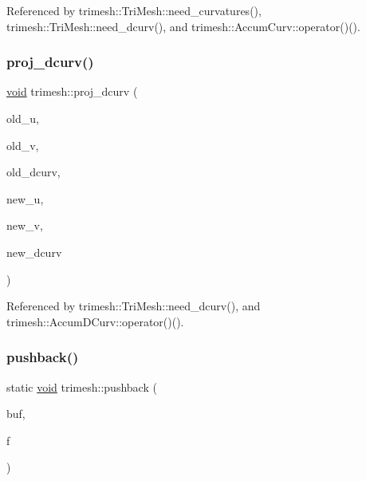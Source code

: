 Referenced by trimesh\+::\+Tri\+Mesh\+::need\+\_\+curvatures(), trimesh\+::\+Tri\+Mesh\+::need\+\_\+dcurv(), and trimesh\+::\+Accum\+Curv\+::operator()().

\mbox{\label{namespacetrimesh_a0869493c6351b5ff95889cd7c3a0eb24}} 
\subsubsection{\texorpdfstring{proj\+\_\+dcurv()}{proj\_dcurv()}}
{\footnotesize\ttfamily \hyperlink{namespacetrimesh_a784ddfd979e1c579bda795a8edfc3f43}{void} trimesh\+::proj\+\_\+dcurv (\begin{DoxyParamCaption}\item[{const \hyperlink{namespacetrimesh_a4fc2b83feba99c931f837a0c7d4b4df1}{vec} \&}]{old\+\_\+u,  }\item[{const \hyperlink{namespacetrimesh_a4fc2b83feba99c931f837a0c7d4b4df1}{vec} \&}]{old\+\_\+v,  }\item[{const \hyperlink{classtrimesh_1_1Vec}{Vec}$<$ 4 $>$}]{old\+\_\+dcurv,  }\item[{const \hyperlink{namespacetrimesh_a4fc2b83feba99c931f837a0c7d4b4df1}{vec} \&}]{new\+\_\+u,  }\item[{const \hyperlink{namespacetrimesh_a4fc2b83feba99c931f837a0c7d4b4df1}{vec} \&}]{new\+\_\+v,  }\item[{\hyperlink{classtrimesh_1_1Vec}{Vec}$<$ 4 $>$ \&}]{new\+\_\+dcurv }\end{DoxyParamCaption})}



Referenced by trimesh\+::\+Tri\+Mesh\+::need\+\_\+dcurv(), and trimesh\+::\+Accum\+D\+Curv\+::operator()().

\mbox{\label{namespacetrimesh_a06aac2116003fae62ad2051991af5845}} 
\subsubsection{\texorpdfstring{pushback()}{pushback()}}
{\footnotesize\ttfamily static \hyperlink{namespacetrimesh_a784ddfd979e1c579bda795a8edfc3f43}{void} trimesh\+::pushback (\begin{DoxyParamCaption}\item[{const char $\ast$}]{buf,  }\item[{F\+I\+LE $\ast$}]{f }\end{DoxyParamCaption})\hspace{0.3cm}{\ttfamily [static]}}



